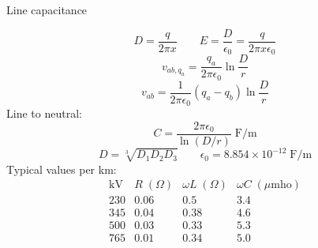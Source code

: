 Line capacitance

$$D=\frac{q}{2\pi x}\qquad E=\frac{D}{\epsilon_0}=\frac{q}{2\pi x\epsilon_0}$$
$$v_{ab,q_a}=\frac{q_a}{2\pi\epsilon_0}\ln\frac{D}{r}$$
$$v_{ab}=\frac{1}{2\pi\epsilon_0}\left(q_a-q_b\right)\ln\frac{D}{r}$$
Line to neutral:
$$C=\frac{2\pi\epsilon_0}{\ln\left(D/r\right)}\;\text{F/m}$$
$$D=\sqrt[3]{D_1D_2D_3}\qquad \epsilon_0=8.854\times10^{-12}\;\text{F/m}$$
Typical values per km:
$$\begin{array}{c|ccc}\text{kV}&R\;(\Omega)&\omega L\;(\Omega)&\omega C\;(\mu\text{mho})\\230&0.06&0.5&3.4\\345&0.04&0.38&4.6\\500&0.03&0.33&5.3\\765&0.01&0.34&5.0\end{array}$$

